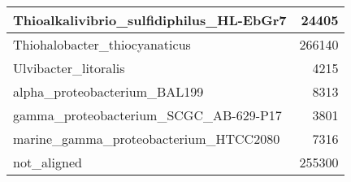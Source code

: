 \documentclass[12pt,a4paper]{article}
\begin{document}
\begin{table}[ht]
\begin{center}
\begin{tabular}{|l*{1}{|r}|}
Thioalkalivibrio\_sulfidiphilus\_HL-EbGr7 & 24405 \\ \hline
Thiohalobacter\_thiocyanaticus & 266140 \\ \hline
Ulvibacter\_litoralis & 4215 \\ \hline
alpha\_proteobacterium\_BAL199 & 8313 \\ \hline
gamma\_proteobacterium\_SCGC\_AB-629-P17 & 3801 \\ \hline
marine\_gamma\_proteobacterium\_HTCC2080 & 7316 \\ \hline
not\_aligned & 255300 \\ \hline
\end{tabular}
\end{center}
\end{table}
\end{document}
